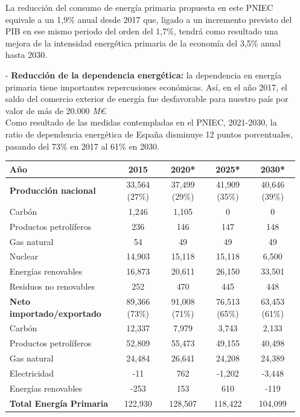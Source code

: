 \begin{itemize}
				\quad La reducción del consumo de energía primaria propuesta en este PNIEC equivale a un 1,9\% anual desde 2017
				que, ligado a un incremento previsto del PIB en ese mismo periodo del orden del 1,7\%, tendrá como resultado
				una mejora de la intensidad energética primaria de la economía del 3,5\% anual hasta 2030.
				
			\item[-] 
				\textbf{Reducción de la dependencia energética:} la dependencia en energía primaria tiene importantes repercusiones económicas. Así, en el año 2017, el saldo del comercio exterior de energía fue desfavorable para nuestro país por valor de más de 20.000 \textit{M€}.\\
				Como resultado de las medidas contempladas en el PNIEC, 2021-2030, la ratio de dependencia energética de España disminuye 12 puntos porcentuales, pasando del 73\% en 2017 al 61\% en 2030.
				
				\begin{center}
					\begin{table}[H]
						\centering
						\begin{tabular}{lcccc}
							\toprule
							Año & 2015 & 2020* & 2025* & 2030* \\
							\midrule
							\textbf{Producción nacional} & 33,564 (27\%) & 37,499 (29\%) & 41,909 (35\%) & 40,646 (39\%) \\
							Carbón & 1,246 & 1,105 & 0 & 0 \\
							Productos petrolíferos & 236 & 146 & 147 & 148 \\
							Gas natural & 54 & 49 & 49 & 49 \\
							Nuclear & 14,903 & 15,118 & 15,118 & 6,500 \\
							Energías renovables & 16,873 & 20,611 & 26,150 & 33,501 \\
							Residuos no renovables & 252 & 470 & 445 & 448 \\
							\midrule
							\textbf{Neto importado/exportado} & 89,366 (73\%) & 91,008 (71\%) & 76,513 (65\%) & 63,453 (61\%) \\
							Carbón & 12,337 & 7,979 & 3,743 & 2,133 \\
							Productos petrolíferos & 52,809 & 55,473 & 49,155 & 40,498 \\
							Gas natural & 24,484 & 26,641 & 24,208 & 24,389 \\
							Electricidad & -11 & 762 & -1,202 & -3,448 \\
							Energías renovables & -253 & 153 & 610 & -119 \\
							\textbf{Total Energía Primaria} & 122,930 & 128,507 & 118,422 & 104,099 \\
							\bottomrule
						\end{tabular}
					\end{table}
				\end{center}
		\end{itemize}
		
